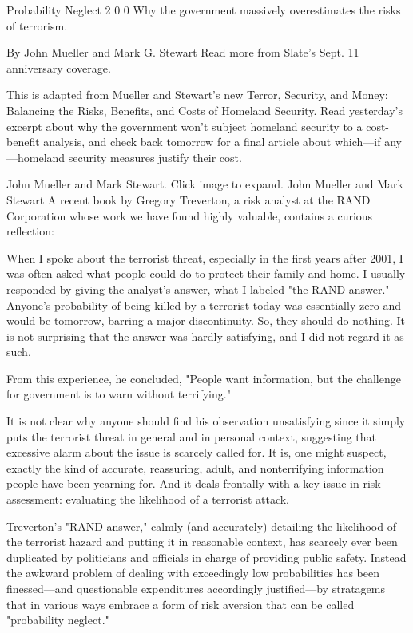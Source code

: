 Probability Neglect
2
0
0
Why the government massively overestimates the risks of terrorism.

By John Mueller and Mark G. Stewart
Read more from Slate's Sept. 11 anniversary coverage.

This is adapted from Mueller and Stewart's new Terror, Security, and Money: Balancing the Risks, Benefits, and Costs of Homeland Security. Read yesterday's excerpt  about why the government won't subject homeland security to a cost-benefit analysis, and check back tomorrow for a final article about which—if any—homeland security measures justify their cost.

John Mueller and Mark Stewart. Click image to expand.
John Mueller and Mark Stewart
A recent book by Gregory Treverton, a risk analyst at the RAND Corporation whose work we have found highly valuable, contains a curious reflection:

When I spoke about the terrorist threat, especially in the first years after 2001, I was often asked what people could do to protect their family and home. I usually responded by giving the analyst's answer, what I labeled "the RAND answer." Anyone's probability of being killed by a terrorist today was essentially zero and would be tomorrow, barring a major discontinuity. So, they should do nothing. It is not surprising that the answer was hardly satisfying, and I did not regard it as such.

From this experience, he concluded, "People want information, but the challenge for government is to warn without terrifying."

It is not clear why anyone should find his observation unsatisfying since it simply puts the terrorist threat in general and in personal context, suggesting that excessive alarm about the issue is scarcely called for. It is, one might suspect, exactly the kind of accurate, reassuring, adult, and nonterrifying information people have been yearning for. And it deals frontally with a key issue in risk assessment: evaluating the likelihood of a terrorist attack.

Treverton's "RAND answer," calmly (and accurately) detailing the likelihood of the terrorist hazard and putting it in reasonable context, has scarcely ever been duplicated by politicians and officials in charge of providing public safety. Instead the awkward problem of dealing with exceedingly low probabilities has been finessed—and questionable expenditures accordingly justified—by stratagems that in various ways embrace a form of risk aversion that can be called "probability neglect."


